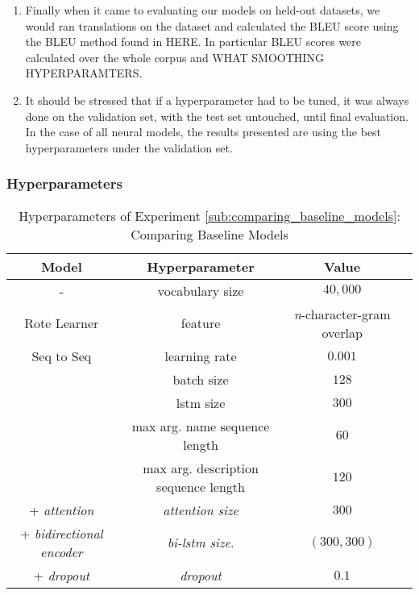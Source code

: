 \begin{enumerate}
    \item Finally when it came to evaluating our models on held-out datasets, we would ran translations on the dataset and calculated the BLEU score using the BLEU method found in HERE.
    In particular BLEU scores were calculated over the whole corpus and WHAT SMOOTHING HYPERPARAMTERS.
    \item It should be stressed that if a hyperparameter had to be tuned, it was always done on the validation set, with the test set untouched, until final evaluation. In the case of all neural models, the results presented are using the best hyperparameters under the validation set.

\end{enumerate}

\subsubsection{Hyperparameters}

\begin{table}[h!]
\begin{center}
\begin{tabular}{ c | c | c | c }
    Model                           {}  & Hyperparameter  & Value    & \\
    \hline
    -                                 & vocabulary size                   & $40,000$ & \\
    \hline
    Rote Learner                      & feature                           & \textit{n}-character-gram overlap & \\
    \hline
    Seq to Seq                        & learning rate                     & $0.001$  & \\
                                      & batch size                        & $128$  & \\
                                      & lstm size                         & $300$  & \\
                                      & max arg. name sequence length         & $60$  & \\
                                      & max arg. description sequence length  & $120$  & \\
    + \textit{attention}              & \textit{attention size}           & $300$  & \\
    + \textit{bidirectional encoder}  & \textit{bi-lstm size}.             & $(300,300) $  & \\
    + \textit{dropout}                & \textit{dropout}                  & $0.1$  & \\
    \hline
\end{tabular}
\caption {Hyperparameters of Experiment \ref{sub:comparing_baseline_models}: Comparing Baseline Models }
\label{table:hyperparams_name_baseline}
\end{center}
\end{table}


